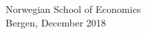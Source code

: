 \documentclass[../Main.tex]{subfiles}
\begin{document}
\vspace*{2\baselineskip}

\lipsum[4-5] %

\vspace*{3\baselineskip}

\center Norwegian School of Economics\\

\center Bergen, December 2018
\vspace*{3\baselineskip}


\makeatletter
\newcommand*{\textoverline}[1]{$\overline{\hbox{#1}}\m@th$}
\makeatother



\makebox[2.5in]{\hrulefill}  \qquad \qquad \qquad \makebox[2.5in]{\hrulefill}

 \qquad \qquad \qquad  {}
\end{document}
